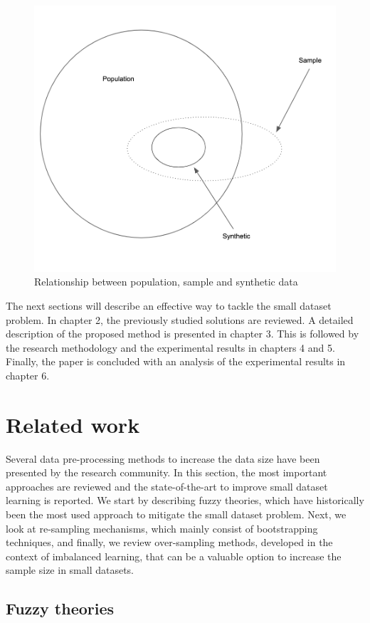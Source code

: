 \documentclass[parskip=full]{scrartcl}
\begin{document}
\begin{figure}[H]
	\centering
	\includegraphics[width=0.75\linewidth]{../analysis/relationship.png}
	\caption{Relationship between population, sample and synthetic data \cite{Li.2006}}
	\label{fig:relationship}
\end{figure}

The next sections will describe an effective way to tackle the small dataset
problem. In chapter 2, the previously studied solutions are reviewed. A detailed
description of the proposed method is presented in chapter 3. This is followed
by the research methodology and the experimental results in chapters 4 and 5.
Finally, the paper is concluded with an analysis of the experimental results in
chapter 6.

\section{Related work}

Several data pre-processing methods to increase the data size have been
presented by the research community. In this section, the most important
approaches are reviewed and the state-of-the-art to improve small dataset
learning is reported. We start by describing fuzzy theories, which have
historically been the most used approach to mitigate the small dataset problem.
Next, we look at re-sampling mechanisms, which mainly consist of bootstrapping
techniques, and finally, we review over-sampling methods, developed in the
context of imbalanced learning, that can be a valuable option to increase the
sample size in small datasets.

\subsection{Fuzzy theories}
\end{document}
